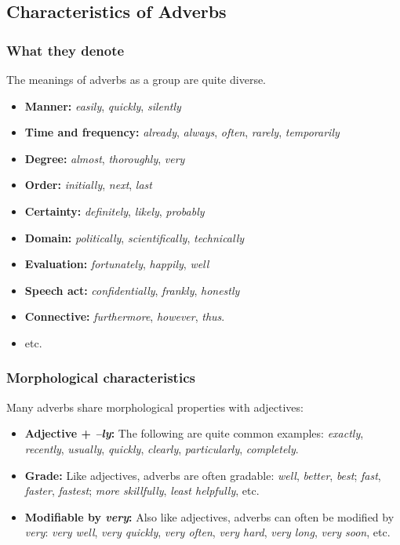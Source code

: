 \subsection{Characteristics of Adverbs}

\subsubsection*{What they denote}

The meanings of adverbs as a group are quite diverse.

\begin{itemize}
    \item \textbf{Manner:} \textit{easily}, \textit{quickly}, \textit{silently}
    \item \textbf{Time and frequency:} \textit{already}, \textit{always}, \textit{often}, \textit{rarely}, \textit{temporarily}
    \item \textbf{Degree:} \textit{almost}, \textit{thoroughly}, \textit{very}
    \item \textbf{Order:} \textit{initially}, \textit{next}, \textit{last}
    \item \textbf{Certainty:} \textit{definitely}, \textit{likely}, \textit{probably}
    \item \textbf{Domain:} \textit{politically}, \textit{scientifically}, \textit{technically}
    \item \textbf{Evaluation:} \textit{fortunately}, \textit{happily}, \textit{well}
    \item \textbf{Speech act:} \textit{confidentially}, \textit{frankly}, \textit{honestly}
    \item \textbf{Connective:} \textit{furthermore}, \textit{however}, \textit{thus}.
    \item etc.
\end{itemize}

\subsubsection*{Morphological characteristics}
Many adverbs share morphological properties with adjectives:
\begin{itemize}
    \item \textbf{Adjective + \textit{--ly}:} The following are quite common examples: \textit{exactly}, \textit{recently}, \textit{usually}, \textit{quickly}, \textit{clearly}, \textit{particularly}, \textit{completely}.
    \item \textbf{Grade:} Like adjectives, adverbs are often gradable: \textit{well}, \textit{better}, \textit{best}; \textit{fast}, \textit{faster}, \textit{fastest}; \textit{more skillfully}, \textit{least helpfully}, etc.
    \item \textbf{Modifiable by \textit{very}:} Also like adjectives, adverbs can often be modified by \textit{very}: \textit{very well}, \textit{very quickly}, \textit{very often}, \textit{very hard}, \textit{very long}, \textit{very soon}, etc.
\end{itemize}

